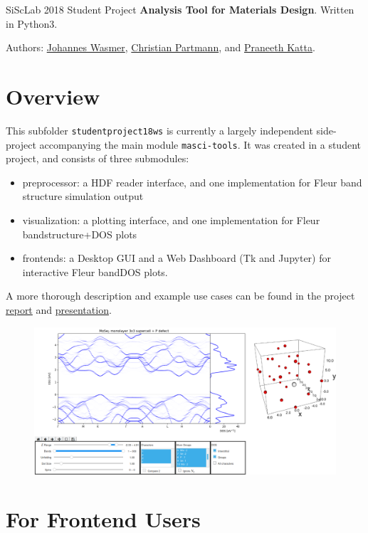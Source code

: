 \documentclass[]{article}
\date{}
\providecommand{\tightlist}{%
  \setlength{\itemsep}{0pt}\setlength{\parskip}{0pt}}
\begin{document}
SiScLab 2018 Student Project \textbf{Analysis Tool for Materials
Design}. Written in Python3.

Authors: \href{https://github.com/Irratzo}{Johannes Wasmer},
\href{https://github.com/ChristianPartmann}{Christian Partmann}, and
\href{https://github.com/PraneethKatta}{Praneeth Katta}.

\section{Overview}\label{overview}

This subfolder \texttt{studentproject18ws} is currently a largely
independent side-project accompanying the main module
\texttt{masci-tools}. It was created in a student project, and consists
of three submodules:

\begin{itemize}
\tightlist
\item
  preprocessor: a HDF reader interface, and one implementation for Fleur
  band structure simulation output
\item
  visualization: a plotting interface, and one implementation for Fleur
  bandstructure+DOS plots
\item
  frontends: a Desktop GUI and a Web Dashboard (Tk and Jupyter) for
  interactive Fleur bandDOS plots.
\end{itemize}

A more thorough description and example use cases can be found in the
project \href{./doc/report.pdf}{report} and
\href{./doc/presentation.pdf}{presentation}.

\begin{figure}
\centering
\includegraphics{./readme/web_frontend.png}
\caption{}
\end{figure}

\section{For Frontend Users}\label{for-frontend-users}
\end{document}

